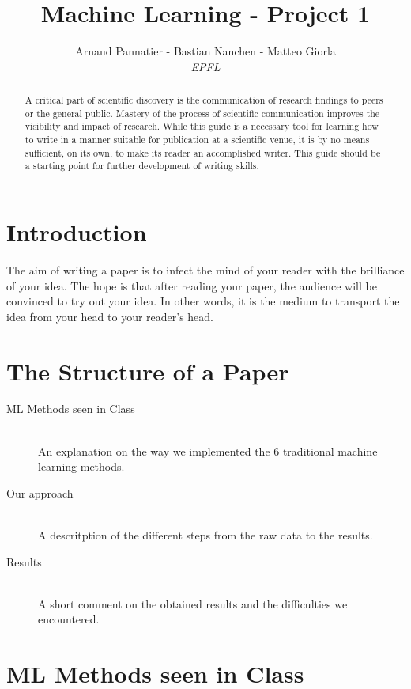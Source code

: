 \documentclass[10pt,conference,compsocconf]{IEEEtran}
\begin{document}
\title{Machine Learning - Project 1}
\author{
  Arnaud Pannatier - 
  Bastian Nanchen - 
  Matteo Giorla\\
  \textit{EPFL}
}
\maketitle

\begin{abstract}
  A critical part of scientific discovery is the
  communication of research findings to peers or the general public.
  Mastery of the process of scientific communication improves the
  visibility and impact of research. While this guide is a necessary
  tool for learning how to write in a manner suitable for publication
  at a scientific venue, it is by no means sufficient, on its own, to
  make its reader an accomplished writer. 
  This guide should be a starting point for further development of 
  writing skills.
\end{abstract}

\section{Introduction}

The aim of writing a paper is to infect the mind of your reader with
the brilliance of your idea. 
The hope is that after reading your
paper, the audience will be convinced to try out your idea. In other
words, it is the medium to transport the idea from your head to your
reader's head.

\section{The Structure of a Paper}

\begin{description}
\item[ML Methods seen in Class] \ \\
  An explanation on the way we implemented the 6 traditional machine learning methods.
\item[Our approach] \ \\
  A descritption of the different steps from the raw data to the results.
\item[Results] \ \\
  A short comment on the obtained results and the difficulties we encountered.
\end{description}

\section{ML Methods seen in Class}
\end{document}
